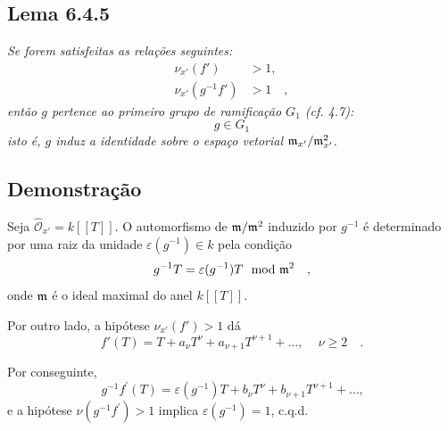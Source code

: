 \subsection*{Lema 6.4.5}
\emph{Se forem satisfeitas as relações seguintes:}
\begin{align*}
\nu_{x'}(f') &> 1 \text{,} \\
\nu_{x'}(g^{-1}f') &> 1 \quad ,
\end{align*}
\emph{então $g$ pertence ao primeiro grupo de ramificação $G_1$ (cf. 4.7):}
\[
g \in G_1
\]
\emph{isto é, $g$ induz a identidade sobre o espaço vetorial $\mathfrak m_{x'}/\mathfrak m_{x'}^2$.}

\subsection*{Demonstração}
Seja $\widehat{\mathcal{O}}_{x'} = k[[T]]$. O automorfismo de $\mathfrak m/\mathfrak m^2$ induzido por $g^{-1}$ é determinado por uma raiz da unidade $\varepsilon(g^{-1}) \in k$ pela condição
\[
g^{-1}T = \varepsilon(g^{-1})T \mod {\mathfrak m}^2 \quad ,
\]
onde $\mathfrak m$ é o ideal maximal do anel $k[[T]]$.

Por outro lado, a hipótese $\nu_{x'}(f') > 1$ dá
\[
f'(T) = T + a_\nu T^\nu + a_{\nu+1} T^{\nu+1} + \ldots \text{, } \quad \nu \geq 2 \quad .
\]

Por conseguinte,
\[
g^{-1}f^{\prime}(T) = \varepsilon(g^{-1})T + b_\nu T^\nu + b_{\nu+1} T^{\nu+1} + \ldots \text{,}
\]
e a hipótese $\nu(g^{-1}f^{\prime}) > 1$ implica $\varepsilon(g^{-1}) = 1$, c.q.d.
